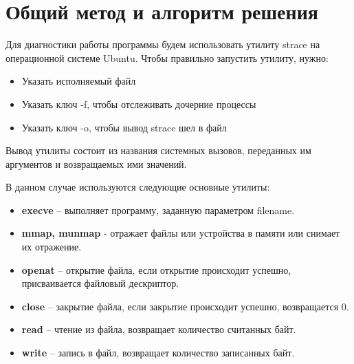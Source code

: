 \section{Общий метод и алгоритм решения}

Для диагностики работы программы будем использовать утилиту strace на операционной системе Ubuntu.
Чтобы правильно запустить утилиту, нужно:

\begin{itemize}
    \item Указать исполняемый файл
    \item Указать ключ -f, чтобы отслеживать дочерние процессы
    \item Указать ключ -o, чтобы вывод strace шел в файл
\end{itemize}

Вывод утилиты состоит из названия системных вызовов, переданных им аргументов и возвращаемых ими значений.

В данном случае используются следующие основные утилиты:

\begin{itemize}
    \item \textbf{execve} -- выполняет программу, заданную параметром filename.
    \item \textbf{mmap, munmap} - отражает файлы или устройства в памяти или снимает их отражение.
    \item \textbf{openat} -- открытие  файла, если открытие происходит успешно, присваивается файловый дескриптор.
    \item \textbf{close} -- закрытие файла, если закрытие происходит успешно, возвращается 0.
    \item \textbf{read} -- чтение из файла, возвращает количество считанных байт.
    \item \textbf{write} -- запись в файл, возвращает количество записанных байт.
\end{itemize}

\pagebreak
